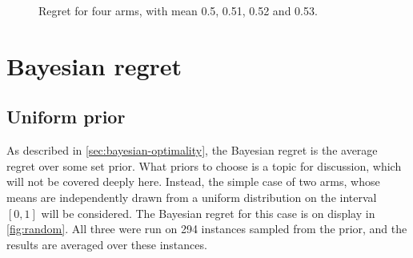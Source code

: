 \begin{figure}
    \centering
    \caption{Regret for four arms, with mean 0.5, 0.51, 0.52 and 0.53.}
    \label{fig:four_arms}
\end{figure}



\clearpage
\section{Bayesian regret}
\label{sec:results_bayesian}

\subsection{Uniform prior}

As described in \cref{sec:bayesian-optimality}, the Bayesian regret is the average regret over some set prior.
What priors to choose is a topic for discussion, which will not be covered deeply here.
Instead, the simple case of two arms, whose means are independently drawn from a uniform distribution on the interval $[0, 1]$ will be considered.
The Bayesian regret for this case is on display in \cref{fig:random}.
All three were run on 294 instances sampled from the prior\footnotemark, and the results are averaged over these instances.

